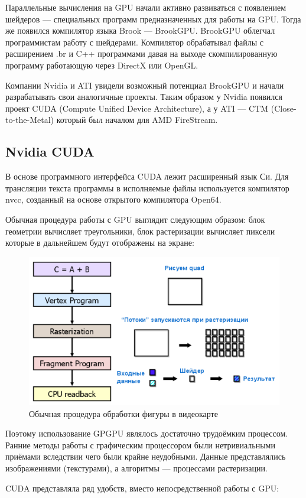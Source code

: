 Параллельные вычисления на GPU начали активно развиваться с появлением шейдеров --- специальных программ предназначенных для работы на GPU. Тогда же появился компилятор языка Brook --- BrookGPU. BrookGPU облегчал программистам работу с шейдерами. Компилятор обрабатывал файлы с расширением .br и C++ программами давая на выходе скомпилированную программу работающую через DirectX или OpenGL.

Компании Nvidia и ATI увидели возможный потенциал BrookGPU и начали разрабатывать свои аналогичные проекты. Таким образом у Nvidia появился проект CUDA (Compute Unified Device Architecture), а у ATI --- CTM (Close-to-the-Metal) который был началом для AMD FireStream.

\subsection {Nvidia CUDA}

В основе программного интерфейса CUDA лежит расширенный язык Си. Для трансляции текста программы в исполняемые файлы используется компилятор nvcc, созданный на основе открытого компилятора Open64.

Обычная процедура работы с GPU выглядит следующим образом: блок геометрии вычисляет треугольники, блок растеризации вычисляет пиксели которые в дальнейшем будут отображены на экране:

\begin{figure}[ht!]
\begin{center}
\includegraphics[width=0.5\linewidth]{img/pipeline2.png}
\caption{Обычная процедура обработки фигуры в видеокарте}
\end{center}
\end{figure}

Поэтому использование GPGPU являлось достаточно трудоёмким процессом. Ранние методы работы с графическим процессором были нетривиальными приёмами вследствии чего были крайне неудобными. Данные представлялись изображениями (текстурами), а алгоритмы --- процессами растеризации.

CUDA представляла ряд удобств, вместо непосредственной работы с GPU:

